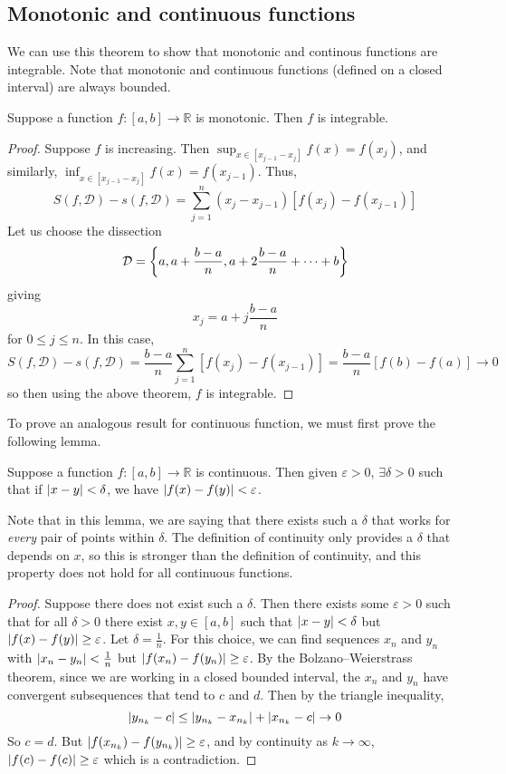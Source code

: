 \subsection{Monotonic and continuous functions}
We can use this theorem to show that monotonic and continous functions are integrable.
Note that monotonic and continuous functions (defined on a closed interval) are always bounded.
\begin{theorem}
	Suppose a function \(f \colon [a, b] \to \mathbb R\) is monotonic.
	Then \(f\) is integrable.
\end{theorem}
\begin{proof}
	Suppose \(f\) is increasing.
	Then \(\sup_{x \in [x_{j-1} - x_j]} f(x) = f(x_j)\), and similarly, \(\inf_{x \in [x_{j-1} - x_j]} f(x) = f(x_{j-1})\).
	Thus,
	\[
		S(f, \mathcal D) - s(f, \mathcal D) = \sum_{j=1}^n (x_j - x_{j-1}) \left[ f(x_j) - f(x_{j-1}) \right]
	\]
	Let us choose the dissection
	\[
		\mathcal D = \qty{ a, a + \frac{b-a}{n}, a + 2\frac{b-a}{n} + \dots + b }
	\]
	giving
	\[
		x_j = a + j\frac{b-a}{n}
	\]
	for \(0 \leq j \leq n\).
	In this case,
	\[
		S(f, \mathcal D) - s(f, \mathcal D) = \frac{b-a}{n} \sum_{j=1}^n \left[ f(x_j) - f(x_{j-1}) \right] = \frac{b-a}{n} \left[ f(b) - f(a) \right] \to 0
	\]
	so then using the above theorem, \(f\) is integrable.
\end{proof}
To prove an analogous result for continuous function, we must first prove the following lemma.
\begin{lemma}
	Suppose a function \(f \colon [a, b] \to \mathbb R\) is continuous.
	Then given \(\varepsilon > 0\), \(\exists \delta > 0\) such that if \(\abs{x-y} < \delta\), we have \(\abs{f(x) - f(y)} < \varepsilon\).
\end{lemma}
Note that in this lemma, we are saying that there exists such a \(\delta\) that works for \textit{every} pair of points within \(\delta\).
The definition of continuity only provides a \(\delta\) that depends on \(x\), so this is stronger than the definition of continuity, and this property does not hold for all continuous functions.
\begin{proof}
	Suppose there does not exist such a \(\delta\).
	Then there exists some \(\varepsilon > 0\) such that for all \(\delta > 0\) there exist \(x, y \in [a, b]\) such that \(\abs{x-y} < \delta\) but \(\abs{f(x) - f(y)} \geq \varepsilon\).
	Let \(\delta = \frac{1}{n}\).
	For this choice, we can find sequences \(x_n\) and \(y_n\) with \(\abs{x_n - y_n} < \frac{1}{n}\) but \(\abs{f(x_n) - f(y_n)} \geq \varepsilon\).
	By the Bolzano--Weierstrass theorem, since we are working in a closed bounded interval, the \(x_n\) and \(y_n\) have convergent subsequences that tend to \(c\) and \(d\).
	Then by the triangle inequality,
	\[
		\abs{y_{n_k} - c} \leq \abs{y_{n_k} - x_{n_k}} + \abs{x_{n_k} - c} \to 0
	\]
	So \(c = d\).
	But \(\abs{f(x_{n_k}) - f(y_{n_k})} \geq \varepsilon\), and by continuity as \(k \to \infty\), \(\abs{f(c) - f(c)} \geq \varepsilon\) which is a contradiction.
\end{proof}
